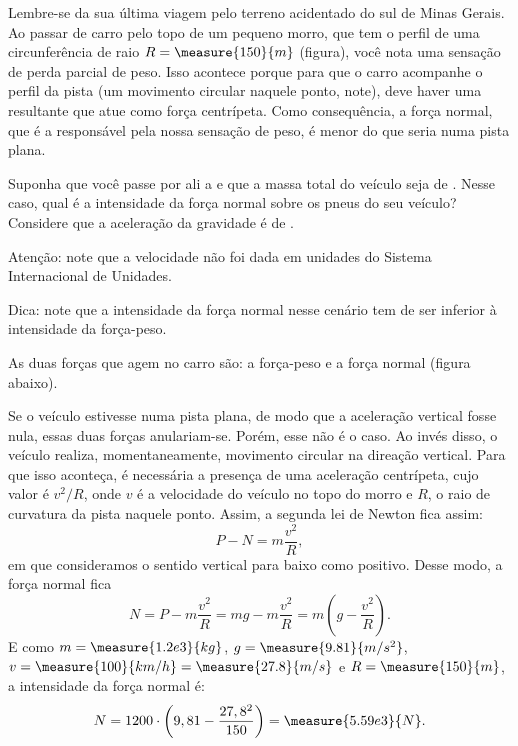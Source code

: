 \begin{question}
	Lembre-se da sua última viagem pelo terreno acidentado do sul de Minas Gerais.
	Ao passar de carro pelo topo de um pequeno morro, que tem o perfil de uma circunferência de raio $R = \measure{150}{m}$ (figura), você nota uma sensação de perda parcial de peso.
	Isso acontece porque para que o carro acompanhe o perfil da pista (um movimento circular naquele ponto, note), deve haver uma resultante que atue como força centrípeta.
	Como consequência, a força normal, que é a responsável pela nossa sensação de peso, é menor do que seria numa pista plana.
	
	Suponha que você passe por ali a  e que a massa total do veículo seja de .
	Nesse caso, qual é a intensidade da força normal sobre os pneus do seu veículo?
	Considere que a aceleração da gravidade é de .


	\begin{compactdesc}
		\item[Atenção:] note que a velocidade não foi dada em unidades do Sistema Internacional de Unidades.
		\item[Dica:] note que a intensidade da força normal nesse cenário tem de ser inferior à intensidade da força-peso.
	\end{compactdesc}

	\begin{answer}
	\end{answer}

	\begin{solution}
		As duas forças que agem no carro são: a força-peso e a força normal (figura abaixo).


		Se o veículo estivesse numa pista plana, de modo que a aceleração vertical fosse nula, essas duas forças anulariam-se.
		Porém, esse não é o caso.
		Ao invés disso, o veículo realiza, momentaneamente, movimento circular na direação vertical.
		Para que isso aconteça, é necessária a presença de uma aceleração centrípeta, cujo valor é $v^2/R$, onde $v$ é a velocidade do veículo no topo do morro e $R$, o raio de curvatura da pista naquele ponto.
		Assim, a segunda lei de Newton fica assim:
		\begin{equation*}
			P - N = m\frac{v^2}{R},
		\end{equation*}
		em que consideramos o sentido vertical para baixo como positivo.
		Desse modo, a força normal fica
		\begin{equation*}
			N = P - m\frac{v^2}{R}
			  = mg - m\frac{v^2}{R}
			  = m\left(g - \frac{v^2}{R}\right).
		\end{equation*}
		E como $m = \measure{1.2e3}{kg}$, $g = \measure{9.81}{m/s^2}$, $v = \measure{100}{km/h} = \measure{27.8}{m/s}$ e $R = \measure{150}{m}$, a intensidade da força normal é:
		\begin{equation*}
			N = 1200 \cdot \left(9,81 - \frac{27,8^2}{150}\right) = \measure{5.59e3}{N}.
		\end{equation*}


\end{solution}
\end{question}
